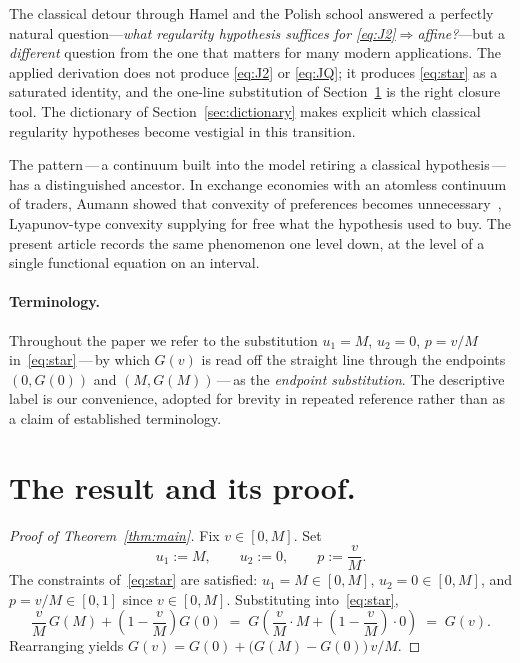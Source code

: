 \documentclass{article}
\theoremstyle{plain}
\theoremstyle{definition}
\begin{document}
The classical detour through Hamel and the Polish school answered a
perfectly natural question---\emph{what regularity hypothesis suffices
for \eqref{eq:J2}$\Rightarrow$affine?}---but a \emph{different}
question from the one that matters for many modern applications. The
applied derivation does not produce \eqref{eq:J2} or \eqref{eq:JQ};
it produces \eqref{eq:star} as a saturated identity, and the one-line
substitution of Section~\ref{sec:proof} is the right closure tool. The
dictionary of Section~\ref{sec:dictionary} makes explicit which classical
regularity hypotheses become vestigial in this transition.

The pattern\,---\,a continuum built into the model retiring a
classical hypothesis\,---\,has a distinguished ancestor. In exchange
economies with an atomless continuum of traders, Aumann showed that
convexity of preferences becomes unnecessary~\cite{Aumann1964},
Lyapunov-type convexity supplying for free what the hypothesis used to
buy. The present article records the same phenomenon one level down, at
the level of a single functional equation on an interval.

\paragraph{Terminology.}
Throughout the paper we refer to the substitution $u_1=M$, $u_2=0$,
$p=v/M$ in~\eqref{eq:star}\,---\,by which $G(v)$ is read off the straight
line through the endpoints $(0,G(0))$ and $(M,G(M))$\,---\,as the
\emph{endpoint substitution}. The descriptive
label is our convenience, adopted for brevity in repeated reference
rather than as a claim of established terminology.

\section{The result and its proof.}
\label{sec:proof}

\begin{proof}[Proof of Theorem~\ref{thm:main}]
Fix $v\in[0,M]$. Set
\[
u_1 := M, \qquad u_2 := 0, \qquad p := \frac{v}{M}.
\]
The constraints of~\eqref{eq:star} are satisfied: $u_1=M\in[0,M]$,
$u_2=0\in[0,M]$, and $p=v/M\in[0,1]$ since $v\in[0,M]$.
Substituting into~\eqref{eq:star},
\[
\frac{v}{M}\,G(M)+\left(1-\frac{v}{M}\right)G(0)
\;=\;
G\!\left(\frac{v}{M}\cdot M+\left(1-\frac{v}{M}\right)\cdot 0\right)
\;=\; G(v).
\]
Rearranging yields $G(v)=G(0)+\bigl(G(M)-G(0)\bigr)\,v/M$.
\end{proof}
\end{document}
